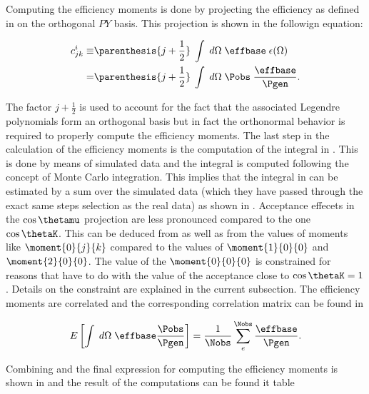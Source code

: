 \noindent Computing the efficiency moments is done by projecting the efficiency as defined in 
on the orthogonal $PY$ basis. This projection is shown in the followign equation:

\begin{align}
  \centering
   c^i_{jk}  \equiv & \parenthesis{j + \frac{1}{2}} \; \int \; d\Omega \; \effbase \; \epsilon(\Omega) \nonumber \\
                 =  & \parenthesis{j + \frac{1}{2}} \; \int \; d\Omega \; \Pobs \; \frac{\effbase}{\Pgen}.
  \label{eff_moms_def}
\end{align}

\noindent The factor $j+\frac{1}{2}$ is used to account for the fact that the associated Legendre
polynomials form an orthogonal basis but in fact the orthonormal behavior is required to properly compute the efficiency moments.
The last step in the calculation of the efficiency moments is the computation of the integral in .
This is done by means of simulated data and the integral is computed following the concept of Monte Carlo integration. This implies
that the integral in  can be estimated by a sum over the simulated data (which they have passed through the exact
same steps selection as the real data) as shown in . Acceptance effecets in the $\cos\thetamu$ projection are less
pronounced compared to the one $\cos\thetaK$. This can be deduced from  as well as from the values of moments like
$\moment{0}{j}{k}$ compared to the values of $\moment{1}{0}{0}$ and $\moment{2}{0}{0}$. The value of the $\moment{0}{0}{0}$
is constrained for reasons that have to do with the value of the acceptance close to $\cos\thetaK=1$.
Details on the constraint are explained in the current subsection. The efficiency moments are correlated and the corresponding
correlation matrix can be found in 

\begin{equation}
\centering
  E\left[ \int \; d\Omega \; \effbase \frac{\Pobs}{\Pgen} \right] = \frac{1}{\Nobs} \sum_e^{\Nobs} \frac{\effbase}{\Pgen}.
  \label{eff_moms_calc}
\end{equation}

\noindent Combining  and  the final expression for computing the efficiency moments is shown
in  and the result of the computations can be found it table 

